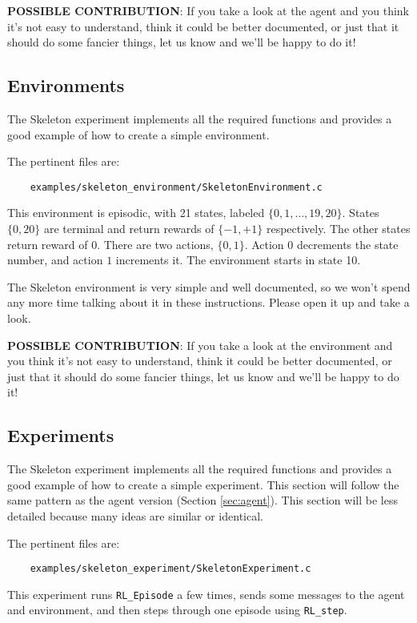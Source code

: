 \documentclass[11pt]{article}
\begin{document}
\textbf{POSSIBLE CONTRIBUTION}: If you take a look at the agent and you think it's not easy to understand, think it could be better documented, 
or just that it should do some fancier things, let us know and we'll be happy to do it!



\subsection{Environments}
The Skeleton experiment implements all the required functions and provides a good example of how to create a simple environment. 

The pertinent files are:
\begin{verbatim}
	examples/skeleton_environment/SkeletonEnvironment.c
\end{verbatim}

This environment is episodic, with 21 states, labeled $\{0, 1,\ldots,19,20\}$. States $\{0, 20\}$ are terminal and return rewards of $\{-1, +1\}$ respectively.  The other states return reward of $0$.
There are two actions, $\{0, 1\}$.  Action $0$ decrements the state number, and action $1$ increments it. The environment starts in state 10.

The Skeleton environment is very simple and well documented, so we won't spend any more time talking about it in these instructions.
Please open it up and take a look.

\textbf{POSSIBLE CONTRIBUTION}: If you take a look at the environment and you think it's not easy to understand, think it could be better documented, 
or just that it should do some fancier things, let us know and we'll be happy to do it!

\subsection{Experiments}
The Skeleton experiment implements all the required functions and provides a good example of how to create a simple experiment.  This section will follow the same 
pattern as the agent version (Section \ref{sec:agent}).  This section will be less detailed because many ideas are similar or identical.

The pertinent files are:
\begin{verbatim}
	examples/skeleton_experiment/SkeletonExperiment.c
\end{verbatim}

This experiment runs \texttt{RL\_Episode} a few times, sends some messages to the agent and environment, and then steps through one episode using \texttt{RL\_step}.
\end{document}
